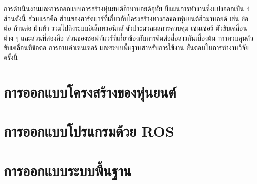 \begin{ganttchart}
\end{ganttchart}

การดำเนินงานและการออกแบบการสร้างหุ่นยนต์ฮิวมานอยด์อุทัย มีแผนการทำงานซึ่งแบ่งออกเป็น 4 ส่วนดังนี้
ส่วนแรกคือ ส่วนของฮาร์ดแวร์ที่เกี่ยวกับโครงสร้างทางกลของหุ่นยนต์ฮิวมานอยด์ เช่น ข้อต่อ ก้านต่อ ฝ่าเท้า
รวมไปถึงระบบอิเล็กทรอนิกส์ ตัวประมวลผลการควบคุม เซนเซอร์ ตัวขับเคลื่อนต่าง ๆ และส่วนที่สองคือ
ส่วนของซอฟท์แวร์ที่เกี่ยวข้องกับการติดต่อสื่อสารกันเบื้องต้น การควบคุมตัวขับเคลื่อนที่ข้อต่อ การอ่านค่าเซนเซอร์
และระบบพื้นฐานสำหรับการใช้งาน ขั้นตอนในการทำงานวิจัยครั้งนี้


\clearpage
\section{การออกแบบโครงสร้างของหุ่นยนต์}


\clearpage
\section{การออกแบบโปรแกรมด้วย ROS}


\clearpage
\section{การออกแบบระบบพื้นฐาน}

